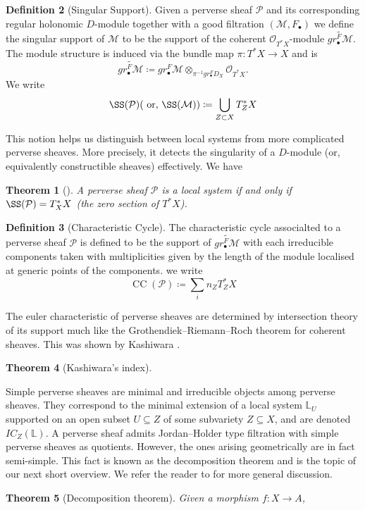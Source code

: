 \documentclass[12pt,reqno]{amsart}
\newtheorem{theorem}{Theorem}
\theoremstyle{question}
\theoremstyle{definition}
\newtheorem{definition}[theorem]{Definition}
\theoremstyle{remark}
\theoremstyle{cited}
\theoremstyle{citeddef}
\DeclareMathOperator{\CC}{CC}
\newcommand{\sM}{\mathcal{M}}
\newcommand{\sO}{\mathcal{O}}
\newcommand{\sP}{\mathcal{P}}
\newcommand{\bbL}{\mathbb{L}}
\begin{document}
\begin{definition}[Singular Support]
Given a perverse sheaf $\sP$ and its corresponding regular holonomic $D$-module together with a good filtration $(\sM, F_{\bullet})$ we define the singular support of $\sM$ to be the support of the coherent $\sO_{T^*X}$-module $\widetilde{gr_{\bullet}^F\sM}$. The module structure is
induced via the bundle map $\pi\colon T^*X\to X$ and is
\[\widetilde{gr_{\bullet}^F\sM} \coloneqq gr_{\bullet}^F\sM\otimes_{\pi^{-1}gr_{\bullet}^FD_X}\sO_{T^*X}.\]
We write
\[\SS(\sP) (\text{ or, } \SS(\sM)) \coloneqq \bigcup_{Z\subset X}T^*_ZX\]

This notion helps us distinguish between local systems from more complicated perverse sheaves. More precisely, it detects the singularity of a $D$-module (or, equivalently constructible sheaves) effectively. We have
\begin{theorem}[{\cite[Proposition 2.2.5]{HTT}}]
A perverse sheaf $\sP$ is a local system if and only if $\SS(\sP) = T^*_XX$ (the zero section of $T^*X$).
\label{thm:support}
\end{theorem}

\end{definition}
\begin{definition}[Characteristic Cycle]
The characteristic cycle associalted to a perverse sheaf $\sP$ is defined to be the support of $\widetilde{gr_{\bullet}^F\sM}$ with
each irreducible components 
taken with multiplicities given by the length of the module localised at generic points of the components. we write
\[\CC(\sP) \coloneqq \sum_i n_ZT^*_ZX\]

\end{definition}
The euler characteristic of perverse sheaves are determined by intersection theory of its support much like the Grothendiek--Riemann--Roch theorem for coherent sheaves. This was shown by Kashiwara \cite{Kas85}.
\begin{theorem}[Kashiwara's index]

\label{thm:index}
\end{theorem}
Simple perverse sheaves are minimal and irreducible objects among perverse sheaves. They correspond to the minimal extension of a local system $\bbL_U$ supported on an open subset $U\subseteq Z$ of some subvariety $Z\subseteq X$, and are denoted $IC_Z(\bbL)$.  A perverse sheaf admits Jordan--Holder type
filtration with simple perverse sheaves as quotients. However, the ones arising geometrically are in fact semi-simple. This fact is known as the decomposition theorem and is the topic of our next short overview. We refer the reader to
\cite[Section 4.5]{HTT08} for more general discussion.
\begin{theorem}[Decomposition theorem]
Given a morphism $f\colon X\to A$,

\label{thm:}
\end{theorem}
\end{document}
